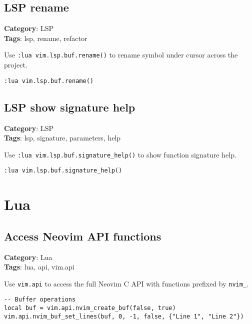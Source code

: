 {{{{{{\section{LSP rename}

\textbf{Category}: LSP\\ \textbf{Tags}: lsp, rename, refactor
\vspace{0.5cm}

Use {\footnotesize \Verb§:lua vim.lsp.buf.rename()§} to rename symbol under cursor across the project.

\begin{Exa*}{}
\begin{Verbatim}[fontsize=\footnotesize, breaklines, breakanywhere]
:lua vim.lsp.buf.rename()
\end{Verbatim}
\end{Exa*}

\section{LSP show signature help}

\textbf{Category}: LSP\\ \textbf{Tags}: lsp, signature, parameters, help
\vspace{0.5cm}

Use {\footnotesize \Verb§:lua vim.lsp.buf.signature_help()§} to show function signature help.

\begin{Exa*}{}
\begin{Verbatim}[fontsize=\footnotesize, breaklines, breakanywhere]
:lua vim.lsp.buf.signature_help()
\end{Verbatim}
\end{Exa*}

\chapter{Lua}
\section{Access Neovim API functions}

\textbf{Category}: Lua\\ \textbf{Tags}: lua, api, vim.api
\vspace{0.5cm}

Use {\footnotesize \Verb§vim.api§} to access the full Neovim C API with functions prefixed by {\footnotesize \Verb§nvim_§}.

\begin{Exa*}{}
\begin{Verbatim}[fontsize=\footnotesize, breaklines, breakanywhere]
-- Buffer operations
local buf = vim.api.nvim_create_buf(false, true)
vim.api.nvim_buf_set_lines(buf, 0, -1, false, {"Line 1", "Line 2"})


\end{Verbatim}
\end{Exa*}}}}}}}
